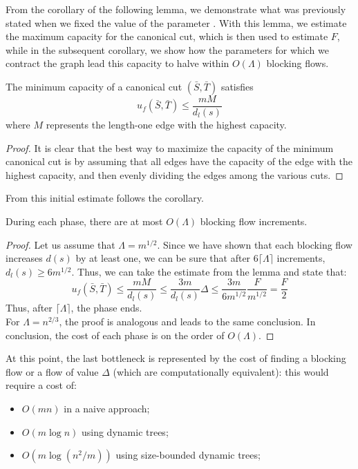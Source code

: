    From the corollary of the following lemma, we demonstrate what was previously stated when we fixed the value of the parameter \dlt.  
    With this lemma, we estimate the maximum capacity for the canonical cut, which is then used to estimate \( F \), while in the subsequent corollary, we show how the parameters for which we contract the graph lead this capacity to halve within \( O(\Lambda) \) blocking flows.

    \begin{lemma}
        The minimum capacity of a canonical cut $(\bar{S}, \bar{T})$ satisfies
        \[u_f(\bar{S}, \bar{T})\le \frac{mM}{d_l(s)}\]
        where $M$ represents the length-one edge with the highest capacity.
    \end{lemma}
    \begin{proof}
        It is clear that the best way to maximize the capacity of the minimum canonical cut is by assuming that all edges have the capacity of the edge with the highest capacity, and then evenly dividing the edges among the various cuts.

    \end{proof}

    From this initial estimate follows the corollary.
    \begin{corollary}
    During each phase, there are at most $O(\Lambda)$ blocking flow increments.
    \end{corollary}
    \begin{proof}
        Let us assume that \( \Lambda = m^{1/2} \). Since we have shown that each blocking flow increases \( d(s) \) by at least one, we can be sure that after \( 6\lceil \Lambda \rceil \) increments, \( d_l(s) \geq 6 m^{1/2} \).  
        Thus, we can take the estimate from the lemma and state that:  
        \[
        u_f(\bar{S}, \bar{T}) \le \frac{mM}{d_l(s)} \le \frac{3m}{d_l(s)}\Delta \le \frac{3m}{6m^{1/2}} \frac{F}{m^{1/2}} = \frac{F}{2}
        \]
        Thus, after \( \lceil \Lambda \rceil \), the phase ends.\\  
        For \( \Lambda = n^{2/3} \), the proof is analogous and leads to the same conclusion.  
        In conclusion, the cost of each phase is on the order of \( O(\Lambda) \).
    \end{proof}
    \newpage

    At this point, the last bottleneck is represented by the cost of finding a blocking flow or a flow of value \( \Delta \) (which are computationally equivalent):  
    this would require a cost of:
    \begin{itemize}
        \item \( O(mn) \) in a naive approach;
        \item \( O(m \log n) \) using dynamic trees\cite{dynamicTrees};
        \item \( O(m \log(n^2/m)) \) using size-bounded dynamic trees;
    \end{itemize}
    
